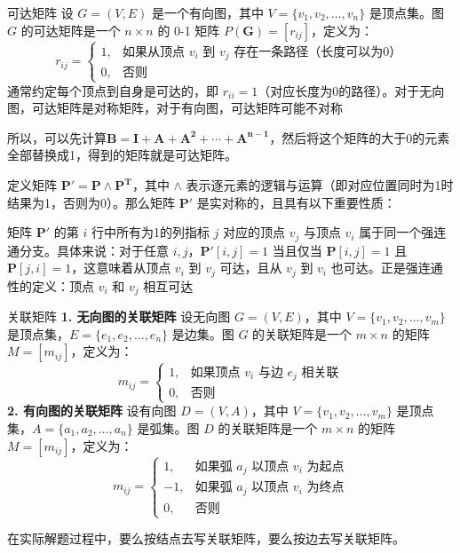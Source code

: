 \documentclass[lang=cn,11pt]{elegantbook}
\begin{document}
\begin{definition}{可达矩阵}
设 $G = (V, E)$ 是一个有向图，其中 $V = \{v_1, v_2, \ldots, v_n\}$ 是顶点集。图 $G$ 的可达矩阵是一个 $n \times n$ 的 0-1 矩阵 $P(\bm{G}) = [r_{ij}]$，定义为：
\[
r_{ij} = 
\begin{cases}
1, & \text{如果从顶点 } v_i \text{ 到 } v_j \text{ 存在一条路径（长度可以为0）} \\
0, & \text{否则}
\end{cases}
\]
通常约定每个顶点到自身是可达的，即 $r_{ii} = 1$（对应长度为0的路径）。对于无向图，可达矩阵是对称矩阵，对于有向图，可达矩阵可能不对称
\end{definition}
所以，可以先计算$\bm{B}=\bm{I}+\bm{A}+\bm{A^2}+\cdots+\bm{A^{n-1}}$，然后将这个矩阵的大于0的元素全部替换成1，得到的矩阵就是可达矩阵。

定义矩阵 $\bm{P'} = \bm{P} \land \bm{P^T}$，其中 $\land$ 表示逐元素的逻辑与运算（即对应位置同时为1时结果为1，否则为0）。那么矩阵 $\bm{P'}$ 是实对称的，且具有以下重要性质：

矩阵 $\bm{P'}$ 的第 $i$ 行中所有为1的列指标 $j$ 对应的顶点 $v_j$ 与顶点 $v_i$ 属于同一个强连通分支。具体来说：对于任意 $i,j$，$\bm{P'}[i,j] = 1$ 当且仅当 $\bm{P}[i,j] = 1$ 且 $\bm{P}[j,i] = 1$，这意味着从顶点 $v_i$ 到 $v_j$ 可达，且从 $v_j$ 到 $v_i$ 也可达。正是强连通性的定义：顶点 $v_i$ 和 $v_j$ 相互可达

\begin{definition}{关联矩阵}
\textbf{1. 无向图的关联矩阵}
设无向图 $G = (V, E)$，其中 $V = \{v_1, v_2, \ldots, v_m\}$ 是顶点集，$E = \{e_1, e_2, \ldots, e_n\}$ 是边集。图 $G$ 的关联矩阵是一个 $m \times n$ 的矩阵 $M = [m_{ij}]$，定义为：
\[
m_{ij} = 
\begin{cases}
1, & \text{如果顶点 } v_i \text{ 与边 } e_j \text{ 相关联} \\
0, & \text{否则}
\end{cases}
\]
\textbf{2. 有向图的关联矩阵}
设有向图 $D = (V, A)$，其中 $V = \{v_1, v_2, \ldots, v_m\}$ 是顶点集，$A = \{a_1, a_2, \ldots, a_n\}$ 是弧集。图 $D$ 的关联矩阵是一个 $m \times n$ 的矩阵 $M = [m_{ij}]$，定义为：
\[
m_{ij} = 
\begin{cases}
1, & \text{如果弧 } a_j \text{ 以顶点 } v_i \text{ 为起点} \\
-1, & \text{如果弧 } a_j \text{ 以顶点 } v_i \text{ 为终点} \\
0, & \text{否则}
\end{cases}
\]
\end{definition}
在实际解题过程中，要么按结点去写关联矩阵，要么按边去写关联矩阵。
\end{document}

